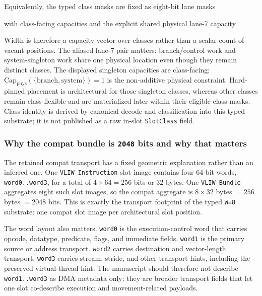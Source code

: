 \documentclass[twocolumn]{article}
\begin{document}
Equivalently, the typed class masks are fixed as eight-bit lane masks

with class-facing capacities and the explicit shared physical lane-7 capacity


Width is therefore a capacity vector over classes rather than a scalar count of vacant positions. The aliased lane-7 pair matters: branch/control work and system-singleton work share one physical location even though they remain distinct classes. The displayed singleton capacities are class-facing; \(\mathrm{Cap}_{\mathrm{phys}}(\{\mathrm{branch},\mathrm{system}\})=1\) is the non-additive physical constraint. Hard-pinned placement is architectural for those singleton classes, whereas other classes remain class-flexible and are materialized later within their eligible class masks. Class identity is derived by canonical decode and classification into this typed substrate; it is not published as a raw in-slot \texttt{SlotClass} field.


\subsubsection{Why the compat bundle is \texttt{2048} bits and why that matters}

The retained compat transport has a fixed geometric explanation rather than an inferred one. One \texttt{VLIW\_Instruction} slot image contains four 64-bit words, \texttt{word0..word3}, for a total of \(4 \times 64 = 256\) bits or \(32\) bytes. One \texttt{VLIW\_Bundle} aggregates eight such slot images, so the compat aggregate is \(8 \times 32\) bytes \(= 256\) bytes \(= 2048\) bits. This is exactly the transport footprint of the typed \texttt{W=8} substrate: one compat slot image per architectural slot position.



The word layout also matters. \texttt{word0} is the execution-control word that carries opcode, datatype, predicate, flags, and immediate fields. \texttt{word1} is the primary source or address transport. \texttt{word2} carries destination and vector-length transport. \texttt{word3} carries stream, stride, and other transport hints, including the preserved virtual-thread hint. The manuscript should therefore not describe \texttt{word1..word3} as DMA metadata only: they are broader transport fields that let one slot co-describe execution and movement-related payloads.
\end{document}
